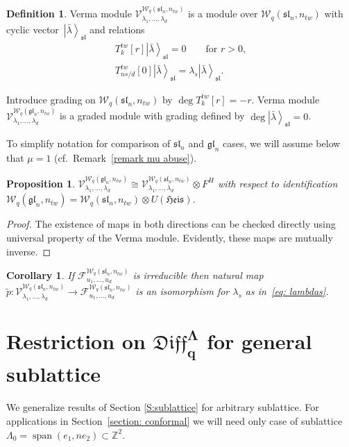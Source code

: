 \documentclass[pdftex]{sigma}
\numberwithin{equation}{section}
\newtheorem{Proposition}[Theorem]{Proposition}
\newtheorem{Corollary}[Theorem]{Corollary}
\theoremstyle{definition}
\newtheorem{Definition}[Theorem]{Definition}
\newcommand{\qD}{\mathfrak{Diff}_q}
\newcommand{ \twW }{ \mathcal{W}_{q} ( \mathfrak{sl}_n, n_{tw} ) }
\newcommand{ \twWgl }{ \mathcal{W}_{q} ( \mathfrak{gl}_n, n_{tw} ) }
\newcommand{\tT}{T^{tw}}
\newcommand{\WFock}{\mathcal{F}^{\twW}_{u_1, \dots, u_d}}
\newcommand{\Ver}{ \mathcal{V}^{\twW}_{\lambda_1, \dots, \lambda_d} }
\newcommand{\Vergl}{\mathcal{V}^{\twWgl}_{\lambda_1, \dots, \lambda_d} }
\newcommand{\vacsl}{ \left| \bar{\lambda} \right\rangle_{\mathfrak{sl}} }
\newcommand{\UH}{\otimes U(\mathfrak{Heis})}
\DeclareMathOperator{\Span}{span}
\begin{document}
\begin{Definition}
Verma module $\Ver$ is a module over $\twW$ with cyclic vector~$\vacsl$ and relations
\begin{gather*}
\tT_k[r] \vacsl =0 \qquad \text{for $r>0$}, \\
\tT_{ns/d}[0] \vacsl = \lambda_s \vacsl.
\end{gather*}
\end{Definition}

Introduce grading on $\twW$ by $\deg T^{tw}_k[r] = -r$. Verma module $\Vergl$ is a graded module with grading defined by $\deg \vacsl = 0$.

To simplify notation for comparison of $\mathfrak{sl}_n$ and $\mathfrak{gl}_n$ cases, we will assume below that $\mu=1$ (cf.\ Remark~\ref{remark mu abuse}).
\begin{Proposition}
$\Vergl \cong \Ver \otimes F^H$ with respect to identification $\twWgl = \twW \UH$.
\end{Proposition}

\begin{proof}
The existence of maps in both directions can be checked directly using universal property of the Verma module.
Evidently, these maps are mutually inverse.
\end{proof}

\begin{Corollary}If $\WFock$ is irreducible then natural map $\tilde{p} \colon \Ver \rightarrow \WFock$ is an isomorphism for $\lambda_s$ as in~\eqref{eq: lambdas}.
\end{Corollary}


\section[Restriction on $\qD^{\Lambda}$ for general sublattice]{Restriction on $\boldsymbol{\qD^{\Lambda}}$ for general sublattice} \label{Section: general sublattice}
We generalize results of Section \ref{S:sublattice} for arbitrary sublattice. For applications in Section~\ref{section: conformal} we will need only case of sublattice $\Lambda_0 = \Span (e_1, ne_2 ) \subset \mathbb{Z}^2$.
\end{document}
